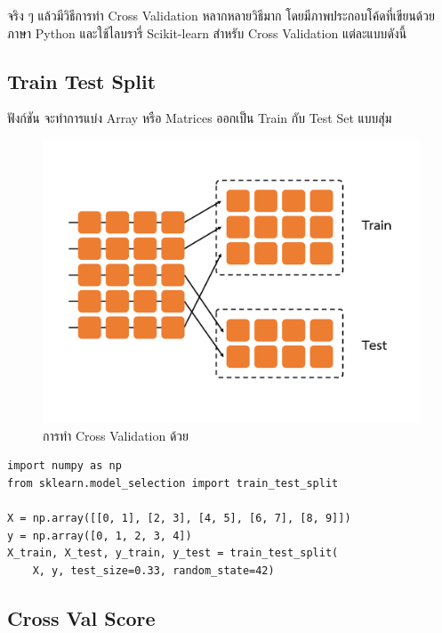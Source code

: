 จริง ๆ แล้วมีวิธีการทำ Cross Validation หลากหลายวิธีมาก โดยมีภาพประกอบโค้ดที่เขียนด้วยภาษา Python และใช้ไลบรารี่ Scikit-learn 
สำหรับ Cross Validation แต่ละแบบดังนี้

\subsection{Train Test Split}
\label{ssec:train_test_split}

ฟังก์ชัน  จะทำการแบ่ง Array หรือ Matrices ออกเป็น Train กับ Test Set แบบสุ่ม

\begin{figure}[H]
    \centering
    \includegraphics[width=0.9\linewidth,page=1]{fig/cross_validation.pdf}
    \caption{การทำ Cross Validation ด้วย }
    \label{fig:train_test_split}
\end{figure}

\begin{lstlisting}[style=MyPython]
import numpy as np
from sklearn.model_selection import train_test_split

X = np.array([[0, 1], [2, 3], [4, 5], [6, 7], [8, 9]])
y = np.array([0, 1, 2, 3, 4])
X_train, X_test, y_train, y_test = train_test_split(
    X, y, test_size=0.33, random_state=42)
\end{lstlisting}

\subsection{Cross Val Score}
\label{ssec:cross_val_score}


